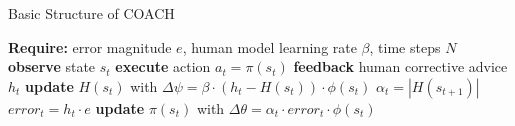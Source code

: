 \begin{algorithm}[H]
\caption{Basic Structure of COACH}\label{algorithm:COACH}
\begin{algorithmic}[1]
\State \textbf{Require:} error magnitude $e$, human model learning rate $\beta$, time steps $N$
\State \textbf{observe} state $s_{t}$
\State \textbf{execute} action $a_{t}=\pi(s_{t})$
\State \textbf{feedback} human corrective advice $h_{t}$
\State \textbf{update} $H(s_{t})$ with $\Delta \psi = \beta\cdot (h_{t}-H(s_{t}))\cdot \phi(s_{t})$
\State $\alpha_{t} = |H(s_{t+1})|$
\State $error_{t} = h_{t}\cdot e$
\State \textbf{update} $\pi(s_{t})$ with $\Delta \theta = \alpha_{t} \cdot error_{t} \cdot \phi(s_{t})$
\EndIf
\EndFor
\end{algorithmic}
\end{algorithm}